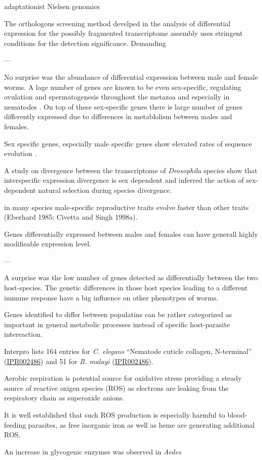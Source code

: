 adaptationist \cite{gould_spandrels_1979} Nielsen genomics
\cite{pmid19744124}


The orthologous screening method develped in the analysis of
differential expression for the possibly fragmented transcriptome
assembly uses stringent conditions for the detection
significance. Demanding 

---

No surprise was the abundance of differential expression between male
and female worms. A lage number of genes are known to be even
sex-specific, regulating ovulation and spermatogenesis throughout the
metazoa \cite{pmid16825664} and especially in nematodes
\cite{pmid15987632}. On top of these sex-specific genes there is large
number of genes differently expressed due to differences in
metablolism between males and females.

Sex specific genes, especially male specific genes show elevated rates
of sequence evolution \cite{pmid11404480,pmid15371532}.

A study on divergence between the transcriptome of \textit{Drosophila}
species show that interspecific expression divergence is sex dependent
\cite{pmid19720861} and inferred the action of sex-dependent natural
selection during species divergence.

in many species male-specific reproductive traits evolve faster than
other traits (Eberhard 1985; Civetta and Singh 1998a).

Genes differentially expressed between males and females can have
generall highly modifieable expression level. 

---

A surprise was the low number of genes detected as differentially
between the two host-species. The genetic differences in those host
species leading to a different immune response have a big influence on
other phenotypes of worms.

Genes identified to differ between populatins can be rather
categorized as important in general metabolic processes instead of
specific host-parasite intereaction.



Interpro lists 164 entries for \textit{C. elegans} ``Nematode cuticle
collagen, N-terminal''
(\href{http://www.ebi.ac.uk/interpro/ISpy?ipr=IPR002486&tax=6239}{IPR002486})
and 51 for \textit{B. malayi}
(\href{http://www.ebi.ac.uk/interpro/ISpy?ipr=IPR002486&tax=6279}{IPR002486}).


Aerobic respiration is potential source for oxidative stress providing
a steady source of reactive oxigen species (ROS) as electrons are
leaking from the respiratory chain as superoxide anions.

It is well established that such ROS production is especially harmful
to blood-feeding parasites, as free inorganic iron as well as heme are
generating additional ROS.

An increase in glycogenic enzymes was observed in \textit{Aedes}


